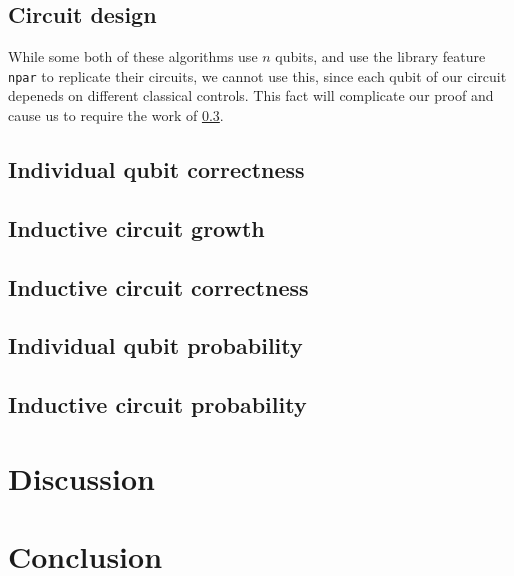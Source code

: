 \documentclass{article}
\begin{document}
\subsection{Circuit design}

While some both of these algorithms use $n$ qubits, and use the library feature \texttt{npar} to replicate their circuits, we cannot use this, since each qubit of our circuit depeneds on different classical controls. This fact will complicate our proof and cause us to require the work of \cref{sec:circuit-growth}.
\subsection{Individual qubit correctness}
\subsection{Inductive circuit growth}\label{sec:circuit-growth}
\subsection{Inductive circuit correctness}
\subsection{Individual qubit probability}
\subsection{Inductive circuit probability}

\section{Discussion}

\section{Conclusion}




\end{document}
